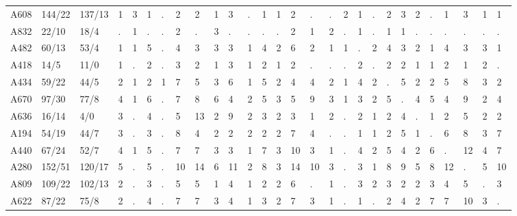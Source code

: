 \documentclass[a4paper, 11]{article}\usepackage[]{graphicx}\usepackage[]{color}
\begin{document}
\begin{table}
\begin{tabular}{rlllllllllllllllllllllllllll}
  A608 & 144/22 & 137/13 & 1 & 3 & 1 & . & 2 & 2 & 1 & 3 & . & 1 & 1 & 2 & . & . & 2 & 1 & . & 2 & 3 & 2 & . & 1 & 3 & 1 & 1 \\ 
  A832 & 22/10 & 18/4 & . & 1 & . & . & 2 & . & 3 & . & . & . & . & 2 & 1 & 2 & . & 1 & . & 1 & 1 & . & . & . & . & . & . \\ 
  A482 & 60/13 & 53/4 & 1 & 1 & 5 & . & 4 & 3 & 3 & 3 & 1 & 4 & 2 & 6 & 2 & 1 & 1 & . & 2 & 4 & 3 & 2 & 1 & 4 & 3 & 3 & 1 \\ 
  A418 & 14/5 & 11/0 & 1 & . & 2 & . & 3 & 2 & 1 & 3 & 1 & 2 & 1 & 2 & . & . & . & 2 & . & 2 & 2 & 1 & 1 & 2 & 1 & 2 & . \\ 
  A434 & 59/22 & 44/5 & 2 & 1 & 2 & 1 & 7 & 5 & 3 & 6 & 1 & 5 & 2 & 4 & 4 & 2 & 1 & 4 & 2 & . & 5 & 2 & 2 & 5 & 8 & 3 & 2 \\ 
  A670 & 97/30 & 77/8 & 4 & 1 & 6 & . & 7 & 8 & 6 & 4 & 2 & 5 & 3 & 5 & 9 & 3 & 1 & 3 & 2 & 5 & . & 4 & 5 & 4 & 9 & 2 & 4 \\ 
  A636 & 16/14 & 4/0 & 3 & . & 4 & . & 5 & 13 & 2 & 9 & 2 & 3 & 2 & 3 & 1 & 2 & . & 2 & 1 & 2 & 4 & . & 1 & 2 & 5 & 2 & 2 \\ 
  A194 & 54/19 & 44/7 & 3 & . & 3 & . & 8 & 4 & 2 & 2 & 2 & 2 & 2 & 7 & 4 & . & . & 1 & 1 & 2 & 5 & 1 & . & 6 & 8 & 3 & 7 \\ 
  A440 & 67/24 & 52/7 & 4 & 1 & 5 & . & 7 & 7 & 3 & 3 & 1 & 7 & 3 & 10 & 3 & 1 & . & 4 & 2 & 5 & 4 & 2 & 6 & . & 12 & 4 & 7 \\ 
  A280 & 152/51 & 120/17 & 5 & . & 5 & . & 10 & 14 & 6 & 11 & 2 & 8 & 3 & 14 & 10 & 3 & . & 3 & 1 & 8 & 9 & 5 & 8 & 12 & . & 5 & 10 \\ 
  A809 & 109/22 & 102/13 & 2 & . & 3 & . & 5 & 5 & 1 & 4 & 1 & 2 & 2 & 6 & . & 1 & . & 3 & 2 & 3 & 2 & 2 & 3 & 4 & 5 & . & 3 \\ 
  A622 & 87/22 & 75/8 & 2 & . & 4 & . & 7 & 7 & 3 & 4 & 1 & 3 & 2 & 7 & 3 & 1 & . & 1 & . & 2 & 4 & 2 & 7 & 7 & 10 & 3 & . \\ 
   \hline
\end{tabular}
\end{table}


\end{document}
